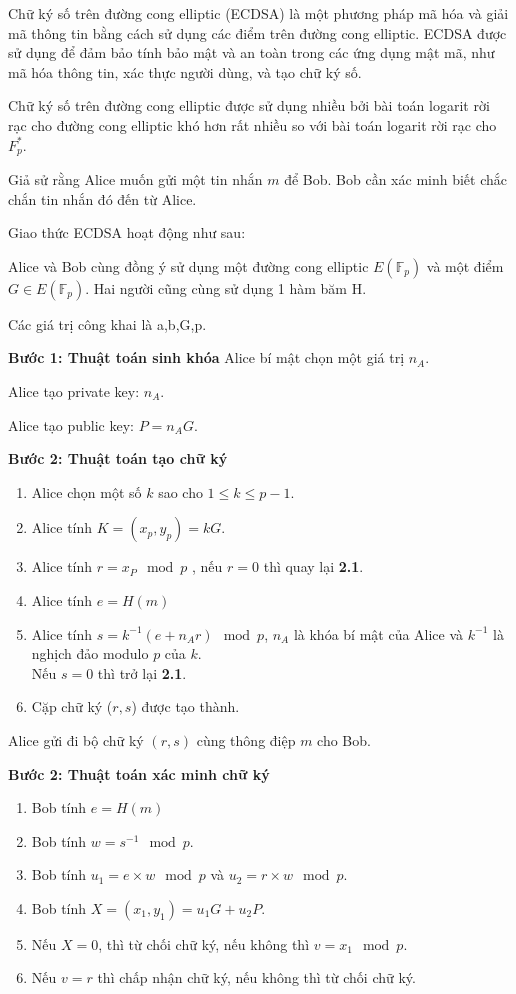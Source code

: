 Chữ ký số trên đường cong elliptic (ECDSA) là một phương pháp mã hóa và giải mã thông tin bằng cách sử dụng các điểm trên đường cong elliptic. ECDSA được sử dụng để đảm bảo tính bảo mật và an toàn trong các ứng dụng mật mã, như mã hóa thông tin, xác thực người dùng, và tạo chữ ký số.

Chữ ký số trên đường cong elliptic được sử dụng nhiều bởi bài toán logarit rời
rạc cho đường cong elliptic khó hơn rất nhiều so với bài toán logarit rời rạc cho $F^*_p$.

Giả sử rằng Alice muốn gửi một tin nhắn $m$ để Bob. Bob cần xác minh biết chắc chắn tin nhắn đó đến từ Alice. 

Giao thức ECDSA hoạt động như sau:

Alice và Bob cùng đồng ý sử dụng một đường cong elliptic $E (\mathbb{F}_p)$ và một điểm $G \in E (\mathbb{F}_p)$.
Hai người cũng cùng sử dụng 1 hàm băm H.

Các giá trị công khai là a,b,G,p.

\textbf{Bước 1: Thuật toán sinh khóa} 
Alice bí mật chọn một giá trị $n_A$.

Alice tạo private key: $n_A$.

Alice tạo public key: $P = n_AG$.

\textbf{Bước 2: Thuật toán tạo chữ ký} 
\begin{enumerate}

	\item Alice chọn một số $k$ sao cho $1 \le k \le p-1$.
	\item Alice tính $K = (x_p, y_p) =  kG$.
	\item Alice tính $r =  x_P \mod p$ , nếu $r = 0$ thì quay lại\textbf{ 2.1}.
	\item Alice tính $e = H(m)$
	\item Alice tính $s = k^{-1}(e+ n_A r)\mod p$, $n_A$ là khóa bí mật của Alice và $k^{-1}$ là nghịch đảo modulo $p$ của $k$.\\
	      Nếu $s = 0$ thì trở lại \textbf{2.1}.                          
	\item  Cặp  chữ ký ($r, s$) được tạo thành.
\end{enumerate}
Alice gửi đi bộ chữ ký $(r,s)$ cùng thông điệp $m$ cho Bob.

\textbf{Bước 2: Thuật toán xác minh chữ ký} 
\begin{enumerate}

	\item Bob tính $e = H(m)$
	\item Bob tính $ w = s^{-1} \mod p$.
	\item Bob tính $u_1 =  e \times w \mod p$ và $u_2 =  r \times w \mod p$.
	\item Bob tính $X =(x_1,y_1)= u_1G + u_2P$.
	\item Nếu $X = 0$, thì từ chối chữ ký, nếu không thì $v = x_1 \mod p$.
	\item Nếu $v=r$ thì chấp nhận chữ ký, nếu không thì từ chối chữ ký.
\end{enumerate}

